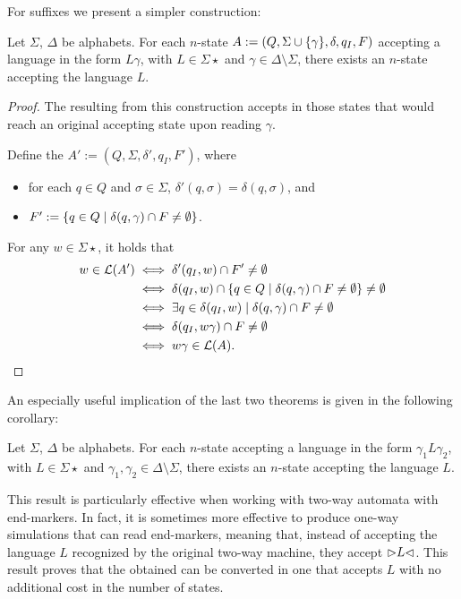 For suffixes we present a simpler construction:
\begin{thrm}
	Let $\Sigma$, $\Delta$ be alphabets.
	For each $n$-state \ONFA $A:=(Q,\Sigma\cup\{\gamma\},\delta,q_I,F)$ accepting a language in the form $L\gamma$, with $L\in\Sigma\star$ and $\gamma\in\Delta\setminus\Sigma$, there exists an $n$-state \ONFA accepting the language $L$.
\end{thrm}
\begin{proof}
	The \ONFA resulting from this construction accepts in those states that would reach an original accepting state upon reading $\gamma$.

	Define the \ONFA $A':=(Q,\Sigma,\delta',q_I,F')$, where
	\begin{itemize}
		\item for each $q\in Q$ and $\sigma\in\Sigma$, $\delta'(q,\sigma)=\delta(q,\sigma)$, and
		\item $F':=\{q\in Q\mid \delta(q,\gamma)\cap F\ne\emptyset\}$.
	\end{itemize}

	For any $w\in\Sigma\star$, it holds that
	\begin{align*}
		w\in\mathcal L(A') & \iff \delta'(q_I,w)\cap F'\ne\emptyset                                                 \\
		                 & \iff \delta(q_I,w)\cap \{q\in Q\mid \delta(q,\gamma)\cap F\ne\emptyset\}\ne\emptyset \\
		                 & \iff \exists q\in\delta(q_I,w)\mid \delta(q,\gamma)\cap F\ne\emptyset                  \\
		                 & \iff \delta(q_I,w\gamma)\cap F\ne\emptyset                                             \\
		                 & \iff w\gamma\in\mathcal L(A) \text. \qedhere
	\end{align*}
\end{proof}

An especially useful implication of the last two theorems is given in the following corollary:
\begin{coro}
	Let $\Sigma$, $\Delta$ be alphabets.
	For each $n$-state \ONFA accepting a language in the form $\gamma_1 L\gamma_2$, with $L\in\Sigma\star$ and $\gamma_1,\gamma_2\in\Delta\setminus\Sigma$, there exists an $n$-state \ONFA accepting the language $L$.
\end{coro}
This result is particularly effective when working with two-way automata with end-markers.
In fact, it is sometimes more effective to produce one-way simulations that can read end-markers, meaning that, instead of accepting the language $L$ recognized by the original two-way machine, they accept $\rhd L\lhd$.
This result proves that the obtained \ONFA can be converted in one that accepts $L$ with no additional cost in the number of states.



